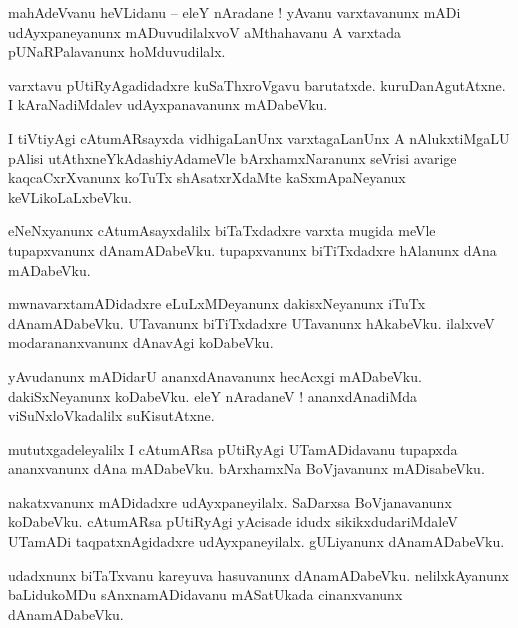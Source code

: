 \documentclass{article}
\begin{document}
\begin{mn}%
mahAdeVvanu heVLidanu -- eleY nAradane ! yAvanu varxtavanunx mADi udAyxpaneyanunx mADuvudilalxvoV 
aMthahavanu A varxtada pUNaRPalavanunx hoMduvudilalx.
\end{mn}

\begin{mn}%
varxtavu pUtiRyAgadidadxre kuSaThxroVgavu barutatxde. kuruDanAgutAtxne. I kAraNadiMdalev 
udAyxpanavanunx mADabeVku.
\end{mn}

\begin{mn}%
I tiVtiyAgi cAtumARsayxda vidhigaLanUnx varxtagaLanUnx A nAlukxtiMgaLU pAlisi 
utAthxneYkAdashiyAdameVle bArxhamxNaranunx seVrisi avarige kaqcaCxrXvanunx koTuTx shAsatxrXdaMte 
kaSxmApaNeyanux keVLikoLaLxbeVku.
\end{mn}

\begin{mn}%
eNeNxyanunx cAtumAsayxdalilx biTaTxdadxre varxta mugida meVle tupapxvanunx dAnamADabeVku. 
tupapxvanunx biTiTxdadxre hAlanunx dAna mADabeVku.
\end{mn}

\begin{mn}%
mwnavarxtamADidadxre eLuLxMDeyanunx dakisxNeyanunx iTuTx dAnamADabeVku. UTavanunx biTiTxdadxre 
UTavanunx hAkabeVku. ilalxveV modarananxvanunx dAnavAgi koDabeVku.
\end{mn}

\begin{mn}%
yAvudanunx mADidarU ananxdAnavanunx hecAcxgi mADabeVku. dakiSxNeyanunx koDabeVku. eleY nAradaneV ! 
ananxdAnadiMda viSuNxloVkadalilx suKisutAtxne.
\end{mn}

\begin{mn}%
mututxgadeleyalilx I cAtumARsa pUtiRyAgi UTamADidavanu tupapxda ananxvanunx dAna mADabeVku. 
bArxhamxNa BoVjavanunx mADisabeVku.
\end{mn}

\begin{mn}%
nakatxvanunx mADidadxre udAyxpaneyilalx. SaDarxsa BoVjanavanunx koDabeVku. cAtumARsa pUtiRyAgi 
yAcisade idudx sikikxdudariMdaleV UTamADi taqpatxnAgidadxre udAyxpaneyilalx. gULiyanunx dAnamADabeVku.
\end{mn}

\begin{mn}%
udadxnunx biTaTxvanu kareyuva hasuvanunx dAnamADabeVku. nelilxkAyanunx baLidukoMDu sAnxnamADidavanu 
mASatUkada cinanxvanunx dAnamADabeVku.
\end{mn}
\end{document}
